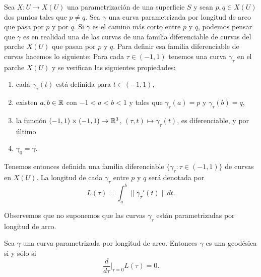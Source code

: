 Sea $X\colon
U\to X(U)$ una parametrización de una superficie $S$ y sean $p,q\in X(U)$ dos
puntos tales que $p\ne q$. Sea $\gamma$ una curva parametrizada por longitud de
arco que pasa por $p$ y por $q$. Si $\gamma$ es el camino más corto entre $p$ y
$q$, podemos pensar que $\gamma$ es en realidad una de las curvas de una
familia diferenciable de curvas del parche $X(U)$ que pasan por $p$ y $q$. Para
definir esa familia diferenciable de curvas hacemos lo siguiente: Para cada
$\tau\in(-1,1)$ tenemos una curva $\gamma_\tau$ en el parche $X(U)$ y se
verifican las siguientes propiedades:
\begin{enumerate}
	\item cada $\gamma_\tau(t)$ está definida para $t\in (-1,1)$, 
	\item existen $a,b\in\mathbb{R}$ con $-1<a<b<1$ y tales que $\gamma_{\tau}(a)=p$ y $\gamma_{\tau}(b)=q$,
	\item la función $(-1,1)\times(-1,1)\to\mathbb{R}^3$, $(\tau,t)\mapsto\gamma_{\tau}(t)$, es diferenciable, y por último
	\item $\gamma_0=\gamma$.
\end{enumerate}
Tenemos entonces definida una familia diferenciable
$\{\gamma_{\tau}:\tau\in(-1,1)\}$ de curvas en $X(U)$. La longitud de cada
$\gamma_{\tau}$ entre $p$ y $q$ será denotada por
\[
	L(\tau)=\int_a^b\|\gamma_{\tau}'(t)\|dt.
\]

Observemos que no suponemos que las curvas $\gamma_{\tau}$ están parametrizadas
por longitud de arco. 

\begin{theorem}
	Sea $\gamma$ una curva parametrizada por longitud de arco. Entonces
	$\gamma$ es una geodésica si y sólo si 
	\[
		\frac{d}{d\tau}\Big|_{\tau=0}L(\tau)=0.
	\]
\end{theorem}

